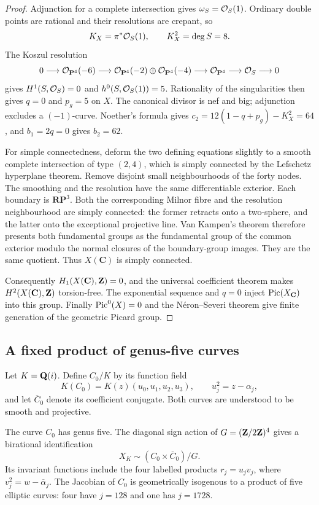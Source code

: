 \begin{proof}
Adjunction for a complete intersection gives $\omega_S=\mathcal O_S(1)$.
Ordinary double points are rational and their resolutions are crepant,
so
\[
 K_X=\pi^*\mathcal O_S(1),\qquad K_X^2=\deg S=8.
\]
The Koszul resolution
\[
 0\longrightarrow\mathcal O_{\mathbf P^4}(-6)
 \longrightarrow\mathcal O_{\mathbf P^4}(-2)\oplus\mathcal O_{\mathbf P^4}(-4)
 \longrightarrow\mathcal O_{\mathbf P^4}
 \longrightarrow\mathcal O_S\longrightarrow0
\]
gives $H^1(S,\mathcal O_S)=0$ and $h^0(S,\mathcal O_S(1))=5$.
Rationality of the singularities then gives $q=0$ and $p_g=5$ on $X$.
The canonical divisor is nef and big; adjunction excludes a
$(-1)$-curve.  Noether's formula gives $c_2=12(1-q+p_g)-K_X^2=64$,
and $b_1=2q=0$ gives $b_2=62$.

For simple connectedness, deform the two defining equations slightly
to a smooth complete intersection of type $(2,4)$, which is simply
connected by the Lefschetz hyperplane theorem.  Remove disjoint small
neighbourhoods of the forty nodes.  The smoothing and the resolution
have the same differentiable exterior.  Each boundary is
$\mathbf{RP}^3$.  Both the corresponding Milnor fibre and the
resolution neighbourhood are simply connected: the former retracts
onto a two-sphere, and the latter onto the exceptional projective
line.  Van Kampen's theorem therefore presents both fundamental
groups as the fundamental group of the common exterior modulo the
normal closures of the boundary-group images.  They are the same
quotient.  Thus $X(\mathbf C)$ is simply connected.

Consequently $H_1(X(\mathbf C),\mathbf Z)=0$, and the universal coefficient
theorem makes $H^2(X(\mathbf C),\mathbf Z)$ torsion-free.  The exponential
sequence and $q=0$ inject $\operatorname{Pic}(X_{\mathbf C})$ into this group.
Finally $\operatorname{Pic}^0(X)=0$ and the N\'eron--Severi theorem give finite
generation of the geometric Picard group.
\end{proof}

\subsection{A fixed product of genus-five curves}

Let $K=\mathbf Q(i)$.  Define $C_0/K$ by its function field
\begin{equation}\label{eq:surface-fixed-curve}
 K(C_0)=K(z)(u_0,u_1,u_2,u_3),\qquad u_j^2=z-\alpha_j,
\end{equation}
and let $\overline C_0$ denote its coefficient conjugate.  Both curves
are understood to be smooth and projective.

\begin{proposition}\label{prop:surface-product}
The curve $C_0$ has genus five.  The diagonal sign action of
$G=(\mathbf Z/2\mathbf Z)^4$ gives a birational identification
\[
 X_K\sim (C_0\times\overline C_0)/G.
\]
Its invariant functions include the four labelled products
$r_j=u_jv_j$, where $v_j^2=w-\overline\alpha_j$.
The Jacobian of $C_0$ is geometrically isogenous to a product of five
elliptic curves: four have $j=128$ and one has $j=1728$.
\end{proposition}

